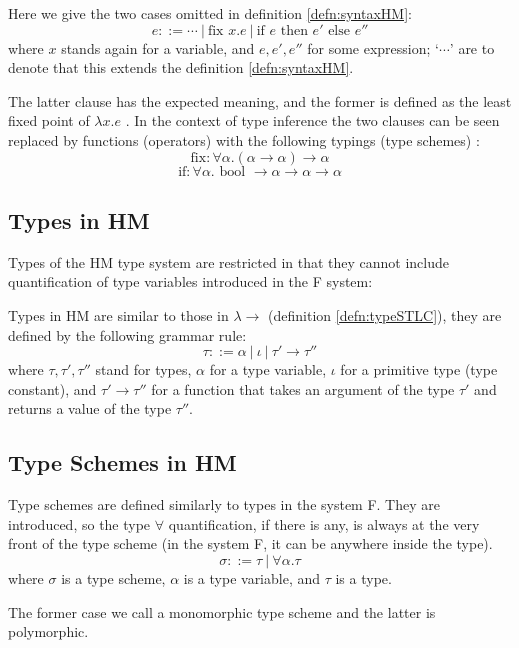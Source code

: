 \begin{defn}
    \label{defn:ifElseHM}
    Here we give the two cases omitted in definition \ref{defn:syntaxHM}:
    $$e ::= \cdots\ |\ \text{fix } x . e\ |\ \text{if } e \text{ then } e' \text{ else } e''$$
    where $x$ stands again for a variable, and $e, e', e''$ for some expression; `$\cdots$' are to denote that this extends the definition \ref{defn:syntaxHM}.

    The latter clause has the expected meaning, and the former is defined as the least fixed point of $\lambda x . e$ \cite{milner1978theory}. In the context of type inference the two clauses can be seen replaced by functions (operators) with the following typings (type schemes) \cite{damas1982principal}:
    $$\text{fix}: \forall \alpha . (\alpha \rightarrow \alpha) \rightarrow \alpha$$
    $$\text{if}: \forall \alpha . \text{ bool } \rightarrow \alpha \rightarrow \alpha \rightarrow \alpha$$
\end{defn}

\subsection{Types in HM}

Types of the HM type system are restricted in that they cannot include quantification of type variables introduced in the F system:

\begin{defn}[Type in HM]
    \label{defn:typeHM}
    Types in HM are similar to those in $\lambda\rightarrow$ (definition \ref{defn:typeSTLC}), they are defined by the following grammar rule:
    $$\tau ::= \alpha\ |\ \iota\ |\ \tau' \rightarrow \tau''$$
    where $\tau, \tau', \tau''$ stand for types, $\alpha$ for a type variable, $\iota$ for a primitive type (type constant), and $\tau' \rightarrow \tau''$ for a function that takes an argument of the type $\tau'$ and returns a value of the type $\tau''$.
\end{defn}

\subsection{Type Schemes in HM}

\begin{defn}
    \label{defn:schemeHM}
    Type schemes are defined similarly to types in the system F. They are introduced, so the type $\forall$ quantification, if there is any, is always at the very front of the type scheme (in the system F, it can be anywhere inside the type).
    $$\sigma ::= \tau\ |\ \forall \alpha . \tau$$
    where $\sigma$ is a type scheme, $\alpha$ is a type variable, and $\tau$ is a type.

    The former case we call a monomorphic type scheme and the latter is polymorphic.
\end{defn}

